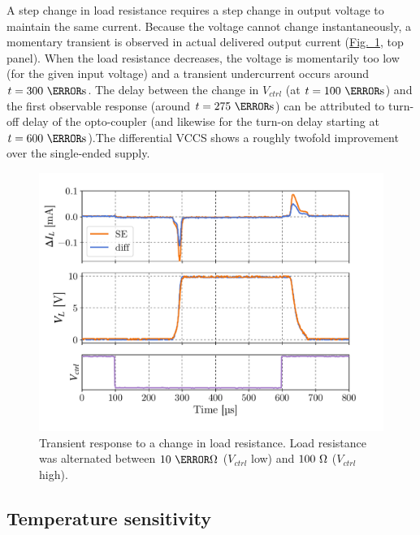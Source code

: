\documentclass[10pt]{article}
\newcommand{\brieffiglink}[1]{\hyperref[#1]{Fig.~\ref*{#1}}}
\begin{document}
A step change in load resistance requires a step change in output voltage to maintain the same current. Because the voltage cannot change instantaneously, a momentary transient is observed in actual delivered output current (\brieffiglink{fig:load_transient_response}, top panel). When the load resistance decreases, the voltage is momentarily too low (for the given input voltage) and a transient undercurrent occurs around $t=300~\micro\second$. The delay between the change in $V_{ctrl}$ (at $t=100~\micro\second$) and the first observable response (around $t=275~\micro\second$) can be attributed to turn-off delay of the opto-coupler \cite{PVT412_datasheet} (and likewise for the turn-on delay starting at $t=600~\micro\second$).The differential VCCS shows a roughly twofold improvement over the single-ended supply.

\begin{figure}[t!]
	\centering
    \includegraphics[scale=.6]{fig_load_transient.pdf}
	\caption{\small Transient response to a change in load resistance. Load resistance was alternated between $10~\kilo\ohm$ ($V_{ctrl}$ low) and $100~\ohm$ ($V_{ctrl}$ high).}
	\label{fig:load_transient_response}
\end{figure}



\subsection{Temperature sensitivity}
\end{document}
